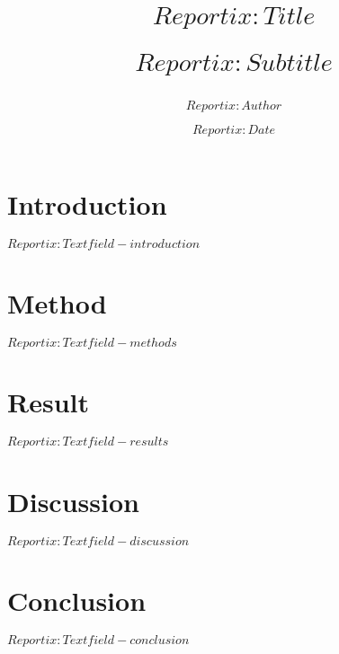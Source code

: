 \documentclass{scrreprt}
\title{
 $Reportix:Title$ \\
\begin{large}
  $Reportix:Subtitle$
\end{large} }
\author{$Reportix:Author$}
\date{$Reportix:Date$}
\begin{document}
\maketitle
\section*{Introduction}
$Reportix:Textfield-introduction$
\section*{Method}
$Reportix:Textfield-methods$
\section*{Result}
$Reportix:Textfield-results$
\section*{Discussion}
$Reportix:Textfield-discussion$
\section*{Conclusion}
$Reportix:Textfield-conclusion$
\end{document}
